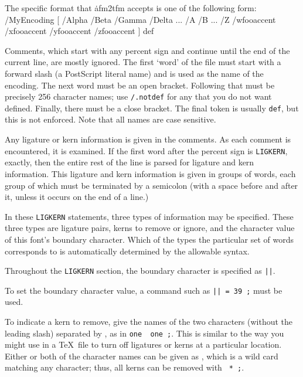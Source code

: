 The specific format that \.{afm2tfm} accepts is one of the following
form:
{\vskip0pt\parskip=0pt
/MyEncoding [ /Alpha /Beta /Gamma /Delta ...
     /A /B ... /Z %
     /wfooaccent /xfooaccent /yfooaccent /zfooaccent ] def
\endverb}

Comments, which start with any percent sign and continue until the
end of the current line, are mostly ignored.  The first `word' of
the file must start with a forward slash (a PostScript literal
name) and is used as the name of the encoding.  The next word must
be an open bracket.  Following that must be precisely 256 character
names; use {\tt /.notdef} for any that you do not want defined.
Finally, there must be a close bracket.  The final token is usually
{\tt def}, but this is not enforced.  Note that all names are
case sensitive.

Any ligature or kern information is given in the comments.  As each
comment is encountered, it is examined.  If the first word after the
percent sign is {\tt LIGKERN}, exactly, then the entire rest of the
line is parsed for ligature and kern information.  This ligature and
kern information is given in groups of words, each group of which must
be terminated by a semicolon (with a space before and after it, unless
it occurs on the end of a line.)

In these {\tt LIGKERN} statements, three types of information may be
specified.  These three types are ligature pairs, kerns to remove or
ignore, and the character value of this font's boundary character.
Which of the types the particular set of words corresponds to is
automatically determined by the allowable syntax.

Throughout the {\tt LIGKERN} section, the boundary character is
specified as {\tt ||}.

To set the boundary character value, a command such as
{\tt || = 39 ;} must be used.

To indicate a kern to remove, give the names of the two characters
(without the leading slash) separated by {\tt {}}, as in
{\tt one \ one ;}.  This is similar to the way you
might use {\tt {}} in a \TeX\ file to turn off ligatures
or kerns at a particular location.  Either or both of the character
names can be given as {\tt *}, which is a wild card matching any
character; thus, all kerns can be removed with {\tt *
\ * ;}.

